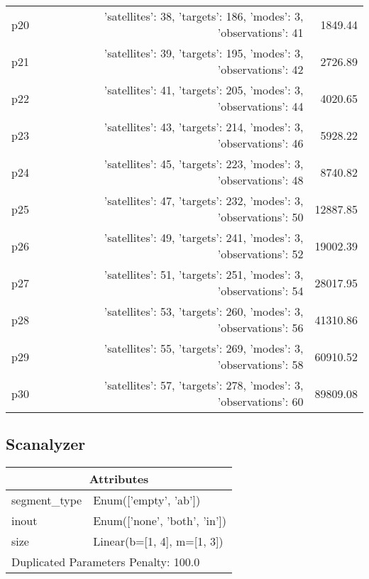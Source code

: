 \documentclass{article}
\begin{document}
\begin{center}
\begin{tabular}{@{}l|r|r@{}}
  p20&{'satellites': 38, 'targets': 186, 'modes': 3, 'observations': 41}&1849.44\\
  p21&{'satellites': 39, 'targets': 195, 'modes': 3, 'observations': 42}&2726.89\\
  p22&{'satellites': 41, 'targets': 205, 'modes': 3, 'observations': 44}&4020.65\\
  p23&{'satellites': 43, 'targets': 214, 'modes': 3, 'observations': 46}&5928.22\\
  p24&{'satellites': 45, 'targets': 223, 'modes': 3, 'observations': 48}&8740.82\\
  p25&{'satellites': 47, 'targets': 232, 'modes': 3, 'observations': 50}&12887.85\\
  p26&{'satellites': 49, 'targets': 241, 'modes': 3, 'observations': 52}&19002.39\\
  p27&{'satellites': 51, 'targets': 251, 'modes': 3, 'observations': 54}&28017.95\\
  p28&{'satellites': 53, 'targets': 260, 'modes': 3, 'observations': 56}&41310.86\\
  p29&{'satellites': 55, 'targets': 269, 'modes': 3, 'observations': 58}&60910.52\\
  p30&{'satellites': 57, 'targets': 278, 'modes': 3, 'observations': 60}&89809.08
                            \end{tabular}
                            \end{center}
                    
                            \newpage \subsection{Scanalyzer}
                    \begin{center}
                    \begin{tabular}{@{}p{}p{}@{}}
                    \multicolumn{2}{c}{\bf \large Attributes}\\\midrule
                    segment\_type & Enum(['empty', 'ab'])\\
inout & Enum(['none', 'both', 'in'])\\
size & Linear(b=[1, 4], m=[1, 3]) \\\midrule
                    \multicolumn{2}{l}{Duplicated Parameters Penalty: 100.0}
                    \end{tabular}
                    \end{center}
                
\end{document}
